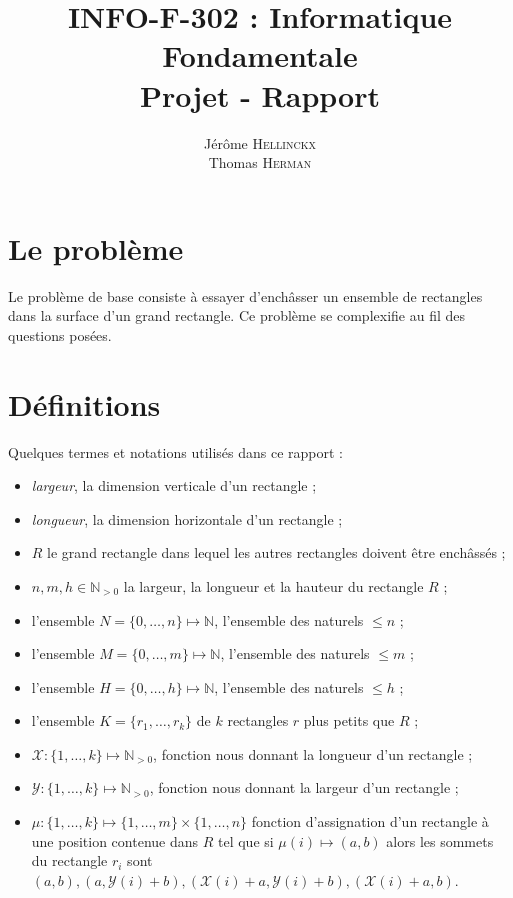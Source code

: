 \documentclass[a4paper]{article}
\title{{\textsc{INFO-F-302} : Informatique Fondamentale} \\ Projet - Rapport}
\author{Jérôme \textsc{Hellinckx} \\ Thomas \textsc{Herman}}
\begin{document}
\renewcommand{\labelitemi}{$\bullet$}

\maketitle
\tableofcontents
\newpage

\section{Le problème}
Le problème de base consiste à essayer d'enchâsser un ensemble de rectangles dans la surface d'un grand rectangle. Ce problème se complexifie au fil des questions posées. 

\section{Définitions}
Quelques termes et notations utilisés dans ce rapport : 
\begin{itemize}
	\item \textit{largeur}, la dimension verticale d'un rectangle ;
	\item \textit{longueur}, la dimension horizontale d'un rectangle ;
	\item $R$ le grand rectangle dans lequel les autres rectangles doivent être enchâssés ;
	\item $ n,m, h \in \mathbb{N}_{>0} $ la largeur, la longueur et la hauteur du rectangle $R$ ;
	\item l'ensemble $N = \{0,\dots,n\} \mapsto \mathbb{N}$, l'ensemble des naturels $\leq n$ ;
   	\item l'ensemble $M = \{0,\dots,m\} \mapsto \mathbb{N}$, l'ensemble des naturels $\leq m$ ;
        \item l'ensemble $H = \{0,\dots,h\} \mapsto \mathbb{N}$, l'ensemble des naturels $\leq h$ ;
	\item l'ensemble $K = \{r_1,\dots ,r_k\}$ de $k$ rectangles $r$ plus petits que $R$ ;
	\item $\mathcal{X}:\{1,\dots,k\} \mapsto \mathbb{N}_{>0} $, fonction nous donnant la longueur d'un rectangle ;
	\item $\mathcal{Y}:\{1,\dots,k\} \mapsto \mathbb{N}_{>0} $, fonction nous donnant la largeur d'un rectangle ;
	\item $\mu :\{1,\dots,k\} \mapsto \{1,\dots,m\}\times\{1,\dots,n\}$ fonction d'assignation d'un rectangle à une position contenue dans $R$ tel que si $\mu(i) \mapsto (a,b)$ alors les sommets du rectangle $r_i$ sont $(a,b), (a,\mathcal{Y}(i)+b), (\mathcal{X}(i)+a,\mathcal{Y}(i)+b), (\mathcal{X}(i)+a,b)$.\\
	
	
\end{itemize}
\end{document}
